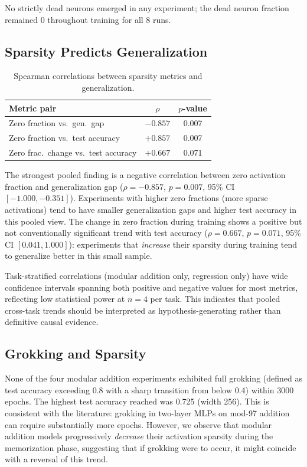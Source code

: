\documentclass[11pt,a4paper]{article}
\begin{document}
No strictly dead neurons emerged in any experiment; the dead neuron
fraction remained 0 throughout training for all 8 runs.

\subsection{Sparsity Predicts Generalization}

\begin{table}[h]
\centering
\caption{Spearman correlations between sparsity metrics and generalization.}
\begin{tabular}{lcc}
\toprule
Metric pair & $\rho$ & $p$-value \\
\midrule
Zero fraction vs.\ gen.\ gap & $-0.857$ & 0.007 \\
Zero fraction vs.\ test accuracy & $+0.857$ & 0.007 \\
Zero frac.\ change vs.\ test accuracy & $+0.667$ & 0.071 \\
\bottomrule
\end{tabular}
\label{tab:correlations}
\end{table}

The strongest pooled finding is a negative correlation between
zero activation fraction and generalization gap ($\rho = -0.857$,
$p = 0.007$, 95\% CI $[-1.000, -0.351]$). Experiments with higher zero
fractions (more sparse activations) tend to have smaller generalization
gaps and higher test accuracy in this pooled view. The change in zero
fraction during training shows a positive but not conventionally
significant trend with test accuracy ($\rho = 0.667$, $p = 0.071$,
95\% CI $[0.041, 1.000]$): experiments that \emph{increase} their
sparsity during training tend to generalize better in this small sample.

Task-stratified correlations (modular addition only, regression only)
have wide confidence intervals spanning both positive and negative values
for most metrics, reflecting low statistical power at $n=4$ per task.
This indicates that pooled cross-task trends should be interpreted as
hypothesis-generating rather than definitive causal evidence.

\subsection{Grokking and Sparsity}

None of the four modular addition experiments exhibited full grokking
(defined as test accuracy exceeding 0.8 with a sharp transition from
below 0.4) within 3000 epochs. The highest test accuracy reached was
0.725 (width 256). This is consistent with the literature:
grokking in two-layer MLPs on mod-97 addition can require substantially
more epochs. However, we observe that modular addition models
progressively \emph{decrease} their activation sparsity during the
memorization phase, suggesting that if grokking were to occur, it might
coincide with a reversal of this trend.
\end{document}
